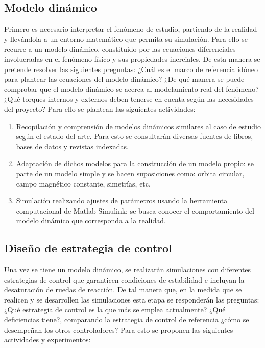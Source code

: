 \subsection{Modelo dinámico} 
Primero es necesario interpretar el fenómeno de estudio, partiendo de la realidad y llevándola a un entorno matemático que permita su simulación. Para ello se recurre a un modelo dinámico, constituido por las ecuaciones diferenciales involucradas en el fenómeno físico y sus propiedades inerciales.
De esta manera se pretende resolver las siguientes preguntas: ¿Cuál es el marco de referencia idóneo para plantear las ecuaciones del modelo dinámico? ¿De qué manera se puede comprobar que el modelo dinámico se acerca al modelamiento real del fenómeno? ¿Qué torques internos y externos deben tenerse en cuenta según las necesidades del proyecto?
Para ello se plantean las siguientes actividades:
\begin{enumerate}[label=\alph*)]
	
	\item Recopilación y comprensión de modelos dinámicos similares al caso de estudio según el estado del arte. Para esto se consultarán diversas fuentes de libros, bases de datos y revistas indexadas.
	
	\item Adaptación de dichos modelos para la construcción de un modelo propio: se parte de un modelo simple y se hacen suposiciones como: orbita circular, campo magnético constante, simetrías, etc.
	
	\item Simulación realizando ajustes de parámetros usando la herramienta computacional de Matlab Simulink: se busca conocer el comportamiento del modelo dinámico que corresponda a la realidad.

	
\end{enumerate}



\subsection{Diseño de estrategia de control} 
Una vez se tiene un modelo dinámico, se realizarán simulaciones con diferentes estrategias de control que garanticen condiciones de estabilidad e incluyan la desaturación de ruedas de reacción. 
De tal manera que, en la medida que se realicen y se desarrollen las simulaciones esta etapa se responderán las preguntas: ¿Qué estrategia de control es la que más se emplea actualmente? ¿Qué deficiencias tiene?, comparando la estrategia de control de referencia ¿cómo se desempeñan los otros controladores? Para esto se proponen las siguientes actividades y experimentos:

